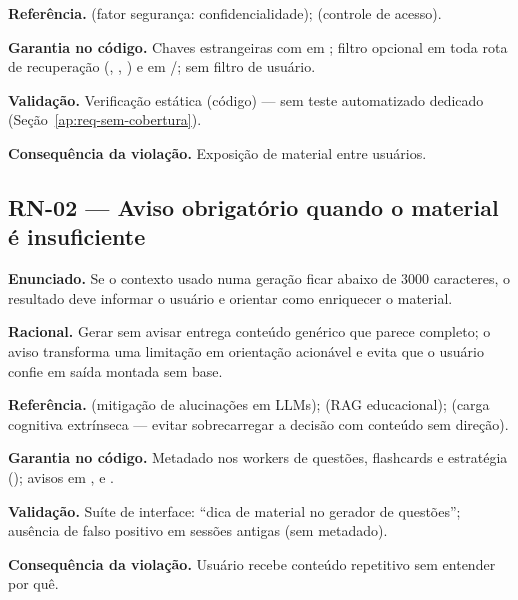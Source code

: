 \textbf{Referência.} \cite{iso_25010} (fator segurança: confidencialidade); \cite{owasp_asvs_2021} (controle de acesso).

\textbf{Garantia no código.} Chaves estrangeiras \texttt{} com \texttt{} em ; filtro opcional \texttt{} em toda rota de recuperação (\texttt{}, \texttt{}, \texttt{}) e em \texttt{}/\texttt{}; \texttt{} sem filtro de usuário.

\textbf{Validação.} Verificação estática (código) --- sem teste automatizado dedicado (Seção~\ref{ap:req-sem-cobertura}).

\textbf{Consequência da violação.} Exposição de material entre usuários.

\subsection{RN-02 --- Aviso obrigatório quando o material é insuficiente}

\textbf{Enunciado.} Se o contexto usado numa geração ficar abaixo de 3000 caracteres, o resultado deve informar o usuário e orientar como enriquecer o material.

\textbf{Racional.} Gerar sem avisar entrega conteúdo genérico que parece completo; o aviso transforma uma limitação em orientação acionável e evita que o usuário confie em saída montada sem base.

\textbf{Referência.} \cite{zhou_2024_mitigating} (mitigação de alucinações em LLMs); \cite{kluibenschadl_2024_rag} (RAG educacional); \cite{kirschner_sweller_clark_2006} (carga cognitiva extrínseca --- evitar sobrecarregar a decisão com conteúdo sem direção).

\textbf{Garantia no código.} Metadado \texttt{} nos workers de questões, flashcards e estratégia (); avisos \texttt{} em \texttt{}, \texttt{} e \texttt{}.

\textbf{Validação.} Suíte de interface: ``dica de material no gerador de questões''; ausência de falso positivo em sessões antigas (sem metadado).

\textbf{Consequência da violação.} Usuário recebe conteúdo repetitivo sem entender por quê.


